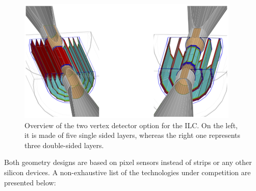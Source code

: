   
   
   \begin{figure}[!h]
     \centering
     \includegraphics[width = 10 cm]{Pictures/vxd/ild_VXD.png}
     \caption{Overview of the two vertex detector option for the ILC. On the left, it is made of five single sided layers, whereas the right one represents three double-sided layers.}
   \end{figure}
   

   Both geometry designs are based on  pixel sensors instead of strips or any other silicon devices.
   A non-exhaustive list of the technologies under competition are presented below:
    
